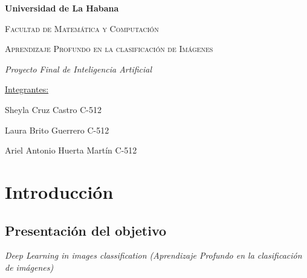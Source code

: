 \documentclass{book}
\begin{document}
	\begin{titlepage}
		\centering
		{\bfseries\LARGE Universidad de La Habana \par }
		\vspace{1cm}
		{\scshape\LARGE Facultad de Matem\'atica y Computaci\'on \par}
		\vspace{3cm}
		{\scshape\Huge Aprendizaje Profundo en la clasificaci\'on de Im\'agenes  \par}
		\vspace{3cm}
		{\itshape\Large Proyecto Final de Inteligencia Artificial \par}
		\vfill
		{\Large \underline{Integrantes:} \par}
		{\Large Sheyla Cruz Castro C-512 \par}
		{\Large Laura Brito Guerrero C-512 \par}
		{\Large Ariel Antonio Huerta Mart\'in C-512 \par}
		\vfill
	\end{titlepage}
	
	\tableofcontents
	\chapter{Introducci\'on}
		\section{Presentaci\'on del objetivo} \label{1p}
			\begin{center}
				\textit{Deep Learning in images classification (Aprendizaje Profundo en la clasificaci\'on de im\'agenes)}
			\end{center}
				
\end{document}
